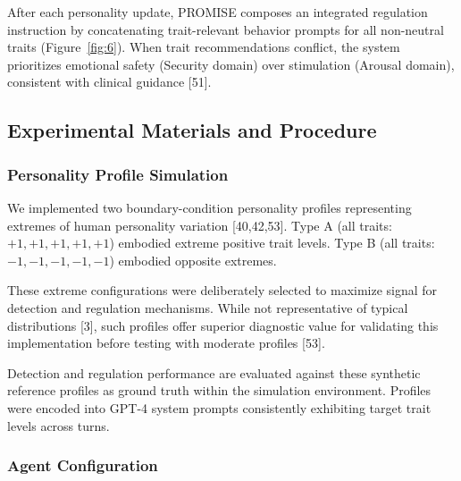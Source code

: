After each personality update, PROMISE composes an integrated regulation instruction by concatenating trait-relevant behavior prompts for all non-neutral traits (Figure~\ref{fig:6}). When trait recommendations conflict, the system prioritizes emotional safety (Security domain) over stimulation (Arousal domain), consistent with clinical guidance {[}51{]}.



\subsection{Experimental Materials and Procedure}\label{experimental-materials-and-procedure}

\subsubsection{Personality Profile Simulation}\label{personality-profile-simulation}

We implemented two boundary-condition personality profiles representing extremes of human personality variation {[}40,42,53{]}. Type A (all traits: $+1, +1, +1, +1, +1$) embodied extreme positive trait levels. Type B (all traits: $-1, -1, -1, -1, -1$) embodied opposite extremes.

These extreme configurations were deliberately selected to maximize signal for detection and regulation mechanisms. While not representative of typical distributions {[}3{]}, such profiles offer superior diagnostic value for validating this implementation before testing with moderate profiles {[}53{]}.

Detection and regulation performance are evaluated against these synthetic reference profiles as ground truth within the simulation environment. Profiles were encoded into GPT-4 system prompts consistently exhibiting target trait levels across turns.

\subsubsection{Agent Configuration}\label{agent-configuration}

